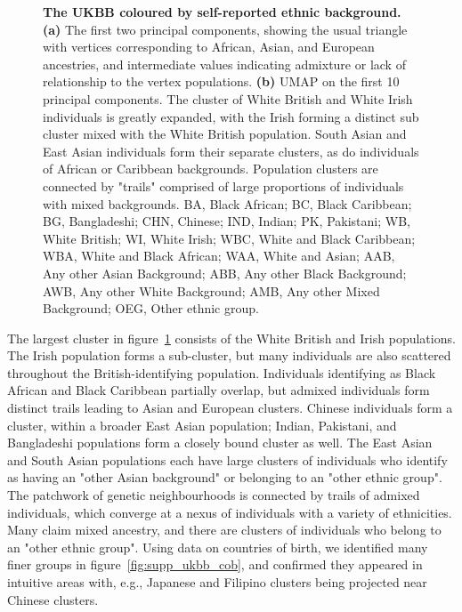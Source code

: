 \documentclass[12pt]{pnas-new}
\begin{document}
\begin{figure}
\begin{subfigure}{.5\columnwidth}
\caption{}%
\label{fig:umap_ukbb_pc10}%
\end{subfigure}%
\caption{\textbf{The UKBB coloured by self-reported ethnic background.} \textbf{(a)} The first two principal components, showing the usual triangle with vertices corresponding to African, Asian, and European ancestries, and intermediate values indicating admixture or lack of relationship to the vertex populations. \textbf{(b)} UMAP on the first 10 principal components. The cluster of White British and White Irish individuals is greatly expanded, with the Irish forming a distinct sub cluster mixed with the White British population. South Asian and East Asian individuals form their separate clusters, as do individuals of African or Caribbean backgrounds. Population clusters are connected by "trails" comprised of large proportions of individuals with mixed backgrounds.
BA, Black African; 
BC, Black Caribbean; 
BG, Bangladeshi; 
CHN, Chinese; 
IND, Indian;
PK, Pakistani;
WB, White British;
WI, White Irish;
WBC, White and Black Caribbean; 
WBA, White and Black African; 
WAA, White and Asian;
AAB, Any other Asian Background; 
ABB, Any other Black Background;
AWB, Any other White Background;
AMB, Any other Mixed Background;
OEG, Other ethnic group. 
}
\label{fig:fig_ukbb}
\end{figure}

The largest cluster in figure~\ref{fig:umap_ukbb_pc10} consists of the White British and Irish populations. The Irish population forms a sub-cluster, but many individuals are also scattered throughout the British-identifying population. Individuals identifying as Black African and Black Caribbean partially overlap, but admixed individuals form distinct trails leading to Asian and European clusters. Chinese individuals form a cluster, within a broader East Asian population; Indian, Pakistani, and Bangladeshi populations form a closely bound cluster as well. The East Asian and South Asian populations each have large clusters of individuals who identify as having an "other Asian background" or belonging to an "other ethnic group". The patchwork of genetic neighbourhoods is connected by trails of admixed individuals, which converge at a nexus of individuals with a variety of ethnicities. Many claim mixed ancestry, and there are clusters of individuals who belong to an "other ethnic group". Using data on countries of birth, we identified many finer groups in figure~\ref{fig:supp_ukbb_cob}, and confirmed they appeared in intuitive areas with, e.g., Japanese and Filipino clusters being projected near Chinese clusters.
\end{document}
